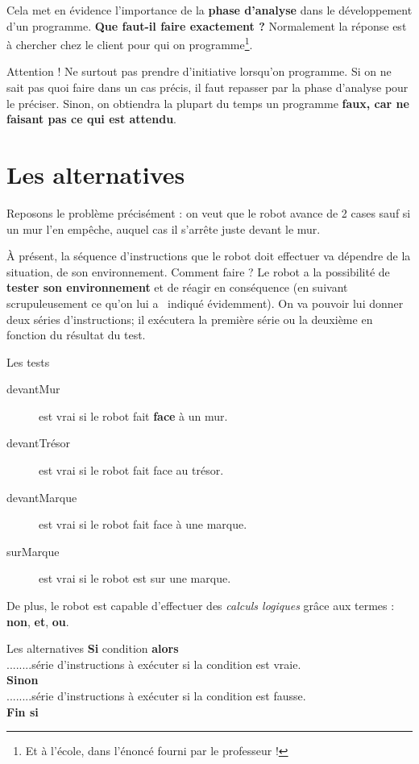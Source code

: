 	Cela met en évidence l'importance de la \textbf{phase
	d'analyse} dans le développement d'un
	programme. \textbf{Que faut-il faire exactement ?} Normalement la
	réponse est à chercher chez le client pour qui on programme\footnote{Et
	à l'école, dans l'énoncé fourni par
	le professeur ! }.
	
	Attention ! Ne surtout pas prendre d'initiative
	lorsqu'on programme. Si on ne sait pas quoi faire dans
	un cas précis, il faut repasser par la phase d'analyse
	pour le préciser. Sinon, on obtiendra la plupart du temps un programme
	\textbf{faux, car ne faisant pas ce qui est attendu}.

\section{Les alternatives}

	Reposons le problème précisément : on veut que le robot avance de 2
	cases sauf si un mur l'en empêche, auquel cas il
	s'arrête juste devant le mur.
	
	À présent, la séquence d'instructions que le robot doit
	effectuer va dépendre de la situation, de son environnement. Comment
	faire ? Le robot a la possibilité de \textbf{tester son environnement}
	et de réagir en conséquence (en suivant scrupuleusement ce
	qu'on lui a \ indiqué évidemment). On va pouvoir lui
	donner deux séries d'instructions; il exécutera la
	première série ou la deuxième en fonction du résultat du test.

	\begin{Emphase}{Les tests}
		\begin{description}
		\item[devantMur]
			est vrai si le robot fait \textbf{face} à un mur.
		\item[devantTrésor] 
			est vrai si le robot fait face au trésor.
		\item[devantMarque]
			est vrai si le robot fait face à une marque.
		\item[surMarque]
			est vrai si le robot est sur une marque.
		\end{description}
		De plus, le robot est capable d'effectuer des 
		\emph{calculs logiques} grâce aux termes :
		{\sffamily\textbf{non}, \textbf{et}, \textbf{ou}}.
	\end{Emphase}

	\begin{Emphase}{Les alternatives}
		{\sffamily\bfseries Si} condition {\sffamily\bfseries alors}
		\\{\color{white}........}série d'instructions à exécuter si la condition est vraie.
		\\{\sffamily\bfseries Sinon}
		\\{\color{white}........}série d'instructions à exécuter si la condition est fausse.
		\\{\sffamily\bfseries Fin si}
	\end{Emphase}

